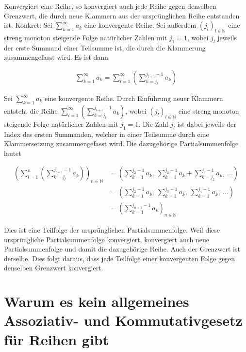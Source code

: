 \documentclass[fontsize=9pt,
               parskip=half-,
               DIV=14,
               listof=chapterentry,
               tocflat]{scrbook}
\begin{document}
\begin{theorem*}
Konvergiert eine Reihe, so konvergiert auch jede Reihe gegen denselben Grenzwert, die durch neue Klammern aus der ursprünglichen Reihe entstanden ist. Konkret: Sei $\sum _{k=1}^{\infty }a_{k}$ eine konvergente Reihe. Sei außerdem $(j_{l})_{l\in \mathbb {N} }$ eine streng monoton steigende Folge natürlicher Zahlen mit $j_{1}=1$, wobei $j_{l}$ jeweils der erste Summand einer Teilsumme ist, die durch die Klammerung zusammengefasst wird. Es ist dann

\begin{align*}
\sum _{k=1}^{\infty }a_{k}=\sum _{l=1}^{\infty }\left(\sum _{k=j_{l}}^{j_{l+1}-1}a_{k}\right)
\end{align*}

\end{theorem*}

\begin{proof*}
Sei $\sum _{k=1}^{\infty }a_{k}$ eine konvergente Reihe. Durch Einführung neuer Klammern entsteht die Reihe $\sum _{l=1}^{\infty }\left(\sum _{k=j_{l}}^{j_{l+1}-1}a_{k}\right)$, wobei $(j_{l})_{l\in \mathbb {N} }$ eine streng monoton steigende Folge natürlicher Zahlen mit $j_{1}=1$. Die Zahl $j_{l}$ ist dabei jeweils der Index des ersten Summanden, welcher in einer Teilsumme durch eine Klammersetzung zusammengefasst wird. Die dazugehörige Partialsummenfolge lautet

\begin{align*}
\left(\sum _{l=1}^{n}\left(\sum _{k=j_{l}}^{j_{l+1}-1}a_{k}\right)\right)_{n\in \mathbb {N} }&=\left(\sum _{k=1}^{j_{2}-1}a_{k},\ \sum _{k=1}^{j_{2}-1}a_{k}+\sum _{k=j_{2}}^{j_{3}-1}a_{k},\ \ldots \right)\\[0.5em]&=\left(\sum _{k=1}^{j_{2}-1}a_{k},\ \sum _{k=1}^{j_{3}-1}a_{k},\ \sum _{k=1}^{j_{4}-1}a_{k},\ \ldots \right)\\[0.5em]&=\left(\sum _{k=1}^{j_{n+1}-1}a_{k}\right)_{n\in \mathbb {N} }
\end{align*}

Dies ist eine Teilfolge der ursprünglichen Partialsummenfolge. Weil diese ursprüngliche Partialsummenfolge konvergiert, konvergiert auch neue Partialsummenfolge und damit die dazugehörige Reihe. Auch der Grenzwert ist derselbe. Dies folgt daraus, dass jede Teilfolge einer konvergenten Folge gegen denselben Grenzwert konvergiert.

\end{proof*}

\section{Warum es kein allgemeines Assoziativ- und Kommutativgesetz für Reihen gibt}
\end{document}
